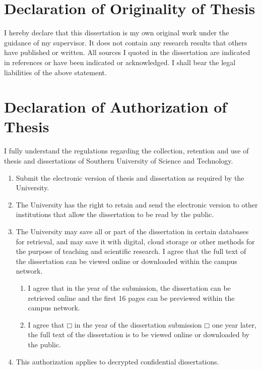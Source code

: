 \begin{statementcopyright}
  \section*{Declaration of Originality of Thesis}
  \vspace{1em}

    I hereby declare that this dissertation is my own original work under the guidance of my supervisor. It does not contain any research results that others have published or written. All sources I quoted in the dissertation are indicated in references or have been indicated or acknowledged. I shall bear the legal liabilities of the above statement.

  \authorsign

  \section*{Declaration of Authorization of Thesis}

  \vspace{1em}

    I fully understand the regulations regarding the collection, retention and use of thesis and dissertations of Southern University of Science and Technology.
    \begin{enumerate}
      \item Submit the electronic version of thesis and dissertation as required by the University.
      \item The University has the right to retain and send the electronic version to other institutions that allow the dissertation to be read by the public.
      \item The University may save all or part of the dissertation in certain databases for retrieval, and may save it with digital, cloud storage or other methods for the purpose of teaching and scientific research. I agree that the full text of the dissertation can be viewed online or downloaded within the campus network.
      \begin{enumerate}[label={(\arabic*)}]
        \item I agree that in the year of the submission, the dissertation can be retrieved online and the first 16 pages can be previewed within the campus network.
        \item I agree that $\mdlgwhtsquare$ in the year of the dissertation submission $\mdlgwhtsquare$ one year later, the full text of the dissertation is to be viewed online or downloaded by the public.
      \end{enumerate}
      \item This authorization applies to decrypted confidential dissertations.
    \end{enumerate}


  \authorsupervisorsign

\end{statementcopyright}